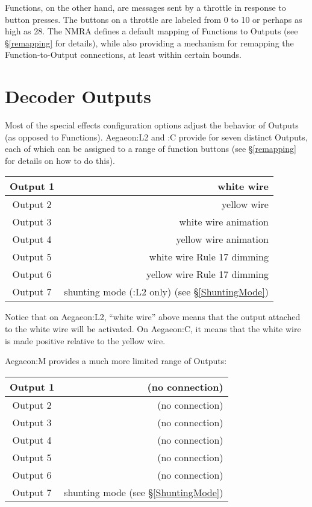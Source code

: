 \documentclass[12pt,letterpaper,draft]{memoir} %
\begin{document}
Functions, on the other hand, are messages sent by a throttle in response to button presses. The buttons on a throttle are labeled from 0 to 10 or perhaps as high as 28. The NMRA defines a default mapping of Functions to Outputs (see \S\ref{remapping} for details), while also providing a mechanism for remapping the Function-to-Output connections, at least within certain bounds.

\section{Decoder Outputs}
\label{outputs}

Most of the special effects configuration options adjust the behavior of Outputs (as opposed to Functions). Aegaeon:L2 and :C provide for seven distinct Outputs, each of which can be assigned to a range of function buttons (see \S\ref{remapping} for details on how to do this).

\begin{center}
\begin{tabular}{|c|r|}
\hline
Output 1 & white wire \\ \hline
Output 2 & yellow wire \\ \hline
Output 3 & white wire animation \\ \hline
Output 4 & yellow wire animation \\ \hline
Output 5 & white wire Rule 17 dimming \\ \hline
Output 6 & yellow wire Rule 17 dimming \\ \hline
Output 7 & shunting mode (:L2 only) (see \S\ref{ShuntingMode})\\ \hline
\end{tabular}
\end{center}

Notice that on Aegaeon:L2, ``white wire'' above means that the output attached to the white wire will be activated. On Aegaeon:C, it means that the white wire is made positive relative to the yellow wire.


Aegaeon:M provides a much more limited range of Outputs:

\begin{center}
\begin{tabular}{|c|r|}
\hline
Output 1 & (no connection) \\ \hline
Output 2 & (no connection) \\ \hline
Output 3 & (no connection) \\ \hline
Output 4 & (no connection) \\ \hline
Output 5 & (no connection) \\ \hline
Output 6 & (no connection) \\ \hline
Output 7 & shunting mode (see \S\ref{ShuntingMode})\\ \hline
\end{tabular}
\end{center}
\end{document}
